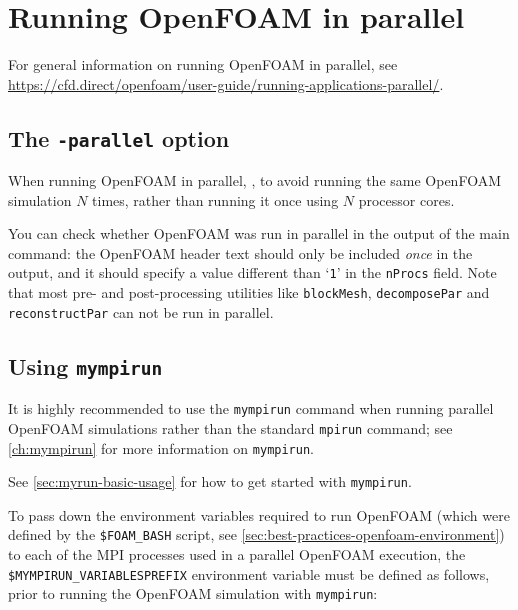 \section{Running OpenFOAM in parallel}

For general information on running OpenFOAM in parallel,
see \url{https://cfd.direct/openfoam/user-guide/running-applications-parallel/}.

\subsection{The \texttt{-parallel} option}

When running OpenFOAM in parallel, ,
to avoid running the same OpenFOAM simulation $N$ times, rather than running it once using $N$ processor cores.

You can check whether OpenFOAM was run in parallel in the output of the main command:
the OpenFOAM header text should only be included \emph{once} in the output, and it should specify a value different
than `\lstinline|1|' in the \lstinline|nProcs| field. Note that most pre- and post-processing utilities like
\lstinline|blockMesh|, \lstinline|decomposePar| and \lstinline|reconstructPar| can not be run in parallel.

\subsection{Using \texttt{mympirun}}

It is highly recommended to use the \lstinline|mympirun| command when running parallel OpenFOAM simulations
rather than the standard \lstinline|mpirun| command;
see \autoref{ch:mympirun} for more information on \lstinline|mympirun|.

See \autoref{sec:myrun-basic-usage} for how to get started with \lstinline|mympirun|.

To pass down the environment variables required to run OpenFOAM (which were defined by the
\lstinline|$FOAM_BASH| script, see \autoref{sec:best-practices-openfoam-environment})
to each of the MPI processes used in a parallel OpenFOAM execution,
the \lstinline|$MYMPIRUN_VARIABLESPREFIX| environment variable must be defined as follows,
prior to running the OpenFOAM simulation with \lstinline|mympirun|:

\begin{prompt}
\end{prompt}

